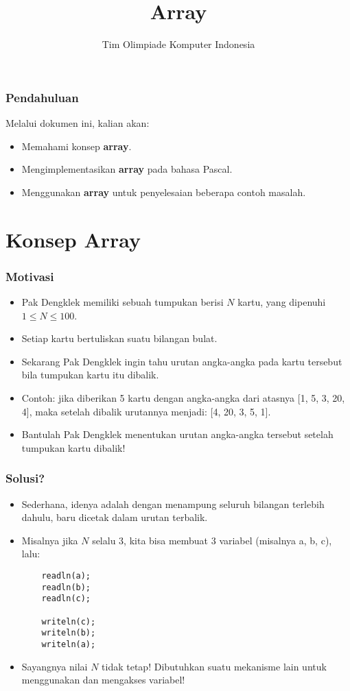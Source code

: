 

\title{Array}
\author{Tim Olimpiade Komputer Indonesia}
\date{}



\begin{frame}
\titlepage
\end{frame}

\begin{frame}
\frametitle{Pendahuluan}
Melalui dokumen ini, kalian akan:
\begin{itemize}
  \item Memahami konsep \textbf{array}.
  \item Mengimplementasikan \textbf{array} pada bahasa Pascal.
  \item Menggunakan \textbf{array} untuk penyelesaian beberapa contoh masalah.
\end{itemize}
\end{frame}

\section{Konsep Array}
\frame{\sectionpage}

\begin{frame}
\frametitle{Motivasi}
\begin{itemize}
  \item Pak Dengklek memiliki sebuah tumpukan berisi $N$ kartu, yang dipenuhi $1 \le N \le 100$.
  \item Setiap kartu bertuliskan suatu bilangan bulat.
  \item Sekarang Pak Dengklek ingin tahu urutan angka-angka pada kartu tersebut bila tumpukan kartu itu dibalik.
  \item Contoh: jika diberikan 5 kartu dengan angka-angka dari atasnya [1, 5, 3, 20, 4], maka setelah dibalik urutannya menjadi: [4, 20, 3, 5, 1].
  \item Bantulah Pak Dengklek menentukan urutan angka-angka tersebut setelah tumpukan kartu dibalik!
\end{itemize}
\end{frame}

\begin{frame}[fragile]
\frametitle{Solusi?}
\begin{itemize}
  \item Sederhana, idenya adalah dengan menampung seluruh bilangan terlebih dahulu, baru dicetak dalam urutan terbalik.
  \item Misalnya jika $N$ selalu 3, kita bisa membuat 3 variabel (misalnya a, b, c), lalu:
  \begin{lstlisting}
    readln(a);
    readln(b);
    readln(c);

    writeln(c);
    writeln(b);
    writeln(a);
  \end{lstlisting}
  \item Sayangnya nilai $N$ tidak tetap! Dibutuhkan suatu mekanisme lain untuk menggunakan dan mengakses variabel!
\end{itemize}
\end{frame}

